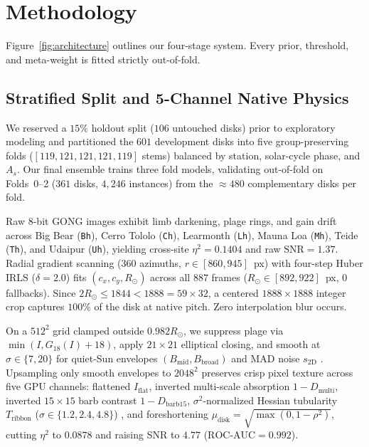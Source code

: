 \documentclass[sigconf]{acmart}
\begin{document}
\section{Methodology}\label{sec:methodology}
    Figure~\ref{fig:architecture} outlines our four-stage system. Every prior, threshold, and meta-weight is fitted strictly out-of-fold.

\subsection{Stratified Split and 5-Channel Native Physics}
    We reserved a $15\%$ holdout split ($106$ untouched disks) prior to exploratory modeling and partitioned the $601$ development disks into five group-preserving folds ($[119,\allowbreak 121,\allowbreak 121,\allowbreak 121,\allowbreak 119]$ stems) balanced by station, solar-cycle phase, and $A_s$. Our final ensemble trains three fold models, validating out-of-fold on Folds~0--2 ($361$ disks, $4{,}246$ instances) from the $\approx 480$ complementary disks per fold.

    Raw $8$-bit GONG images exhibit limb darkening, plage rings, and gain drift across Big Bear (\texttt{Bh}), Cerro Tololo (\texttt{Ch}), Learmonth (\texttt{Lh}), Mauna Loa (\texttt{Mh}), Teide (\texttt{Th}), and Udaipur (\texttt{Uh}), yielding cross-site $\eta^2 = 0.1404$ and raw $\text{SNR} = 1.37$. Radial gradient scanning ($360$ azimuths, $r \in [860, 945]$~px) with four-step Huber IRLS ($\delta = 2.0$) fits $(c_x, c_y, R_\odot)$ across all $887$ frames ($R_\odot \in [892, 922]$~px, $0$ fallbacks). Since $2 R_\odot \le 1844 < 1888 = 59 \times 32$, a centered $1888 \times 1888$ integer crop captures $100\%$ of the disk at native pitch. Zero interpolation blur occurs.

    On a $512^2$ grid clamped outside $0.982 R_\odot$, we suppress plage via $\min(I, G_{18}(I) + 18)$, apply $21 \times 21$ elliptical closing, and smooth at $\sigma \in \{7, 20\}$ for quiet-Sun envelopes $(B_{\text{mid}}, B_{\text{broad}})$ and MAD noise $s_{\text{2D}}$ \cite{lindeberg1998edge}. Upsampling only smooth envelopes to $2048^2$ preserves crisp pixel texture across five GPU channels: flattened $I_{\text{flat}}$, inverted multi-scale absorption $1 - D_{\text{multi}}$, inverted $15 \times 15$ barb contrast $1 - D_{\text{barb15}}$, $\sigma^2$-normalized Hessian tubularity $T_{\text{ribbon}}$ ($\sigma \in \{1.2, 2.4, 4.8\}$) \cite{frangi1998multiscale}, and foreshortening $\mu_{\text{disk}} = \sqrt{\max(0, 1 - \rho^2)}$, cutting $\eta^2$ to $0.0878$ and raising SNR to $4.77$ ($\text{ROC-AUC} = 0.992$).
\end{document}
